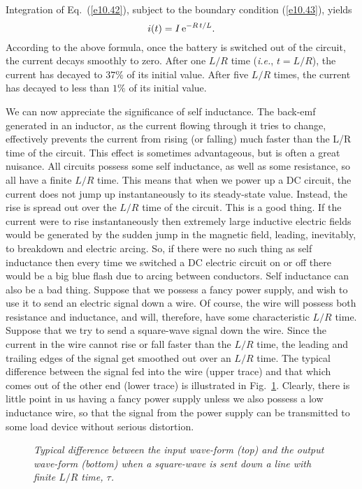 Integration of Eq.~(\ref{e10.42}), subject to the boundary condition (\ref{e10.43}), yields
\begin{equation}
i(t) = I\,{\rm e}^{-R\,t/L}.
\end{equation}
According to the above formula, once the battery is switched out of
the circuit, the current decays smoothly to zero. After one $L/R$ time
({\em i.e.}, $t=L/R$), the current has decayed to $37\%$ of its initial
value. After five $L/R$ times, the current has decayed to less than
$1\%$ of its initial value. 

We can now appreciate the significance of self inductance. The back-emf
generated in an inductor, as the current flowing through it
tries to change, effectively prevents the
current from rising (or falling) much faster than the L/R time of the
circuit. This effect is
sometimes advantageous, but is often a great nuisance.
All circuits possess some self inductance, as well as some resistance, so
all have a finite $L/R$ time. This means that when we power up a DC circuit, the current
does not jump up instantaneously to its steady-state value. Instead, the
rise is spread out over the $L/R$ time of the circuit. This is a good thing.
If the current were to rise instantaneously then extremely large 
inductive electric
fields would be generated by the sudden jump in the magnetic field, leading,
inevitably, to breakdown and electric arcing. So, if there were no such thing
as self inductance then every time we switched a DC electric circuit on or off
there would be a big blue flash due to arcing between
 conductors. Self inductance
can also be a bad thing. Suppose that we possess a fancy power supply, and wish
to use it to send an electric signal down a wire.
Of course, the wire will possess both resistance and inductance,
and will, therefore, have some characteristic $L/R$ time. Suppose that we
try to send a square-wave signal down the wire. Since the current in the wire
cannot rise or fall faster than the $L/R$ time,  the leading and trailing edges of
the signal get smoothed out over an $L/R$ time. The typical difference between
the signal fed into the wire (upper trace) and that which comes out of the
other end (lower trace) is illustrated in Fig.~\ref{f10.5}. Clearly, there is little
point in us having a fancy power supply unless we also possess a low inductance
wire, so that the signal from the power supply can be
transmitted to some load device without serious distortion. 

\begin{figure}
\epsfysize=2in
\centerline{}
\caption{\em Typical difference between the input wave-form (top)
and the output wave-form (bottom) when a square-wave is sent down a
line with finite $L/R$ time, $\tau$.}\label{f10.5}
\end{figure}

